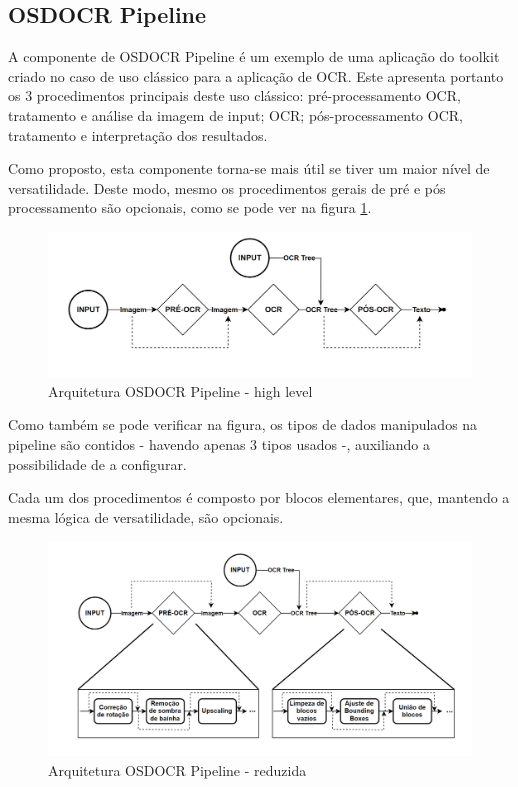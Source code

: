 \subsection{OSDOCR Pipeline}

A componente de OSDOCR Pipeline é um exemplo de uma aplicação do toolkit criado no caso de uso clássico para a aplicação de OCR. Este apresenta portanto os 3 procedimentos principais deste uso clássico: pré-processamento OCR, tratamento e análise da imagem de input; OCR; pós-processamento OCR, tratamento e interpretação dos resultados.

Como proposto, esta componente torna-se mais útil se tiver um maior nível de versatilidade. Deste modo, mesmo os procedimentos gerais de pré e pós processamento são opcionais, como se pode ver na figura \ref{fig:arquitetura_pipeline_high_level}.

\begin{figure}[H]
	\centering
	\includegraphics[width=1\textwidth]{images/diagramas/arquitetura_pipeline_high_level.png}
	\caption{Arquitetura OSDOCR Pipeline - high level}
	\label{fig:arquitetura_pipeline_high_level}
\end{figure}

Como também se pode verificar na figura, os tipos de dados manipulados na pipeline são contidos - havendo apenas 3 tipos usados -, auxiliando a possibilidade de a configurar.


Cada um dos procedimentos é composto por blocos elementares, que, mantendo a mesma lógica de versatilidade, são opcionais.


\begin{figure}[H]
	\centering
	\includegraphics[width=1\textwidth]{images/diagramas/arquitetura_pipeline_reduced.png}
	\caption{Arquitetura OSDOCR Pipeline - reduzida}
	\label{fig:arquitetura_pipeline_reduced}
\end{figure}

